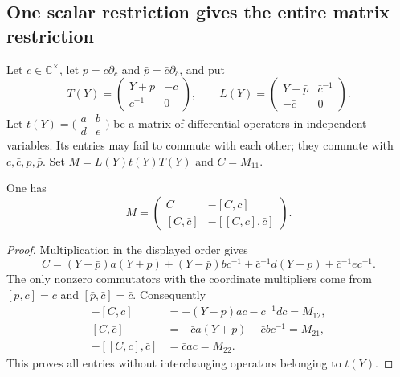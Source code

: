 \subsection{One scalar restriction gives the entire matrix restriction}

Let $c\in\mathbb C^\times$, let $p=c\partial_c$ and
$\bar p=\bar c\partial_{\bar c}$, and put
\[
 T(Y)=\begin{pmatrix}Y+p&-c\\c^{-1}&0\end{pmatrix},\qquad
 L(Y)=\begin{pmatrix}Y-\bar p&\bar c^{-1}\\-\bar c&0\end{pmatrix}.
\]
Let $t(Y)=\bigl(\begin{smallmatrix}a&b\\d&e\end{smallmatrix}\bigr)$
be a matrix of differential operators in independent variables.
Its entries may fail to commute with each other; they commute with
$c,\bar c,p,\bar p$.  Set $M=L(Y)t(Y)T(Y)$ and $C=M_{11}$.

\begin{lemma}\label{cm-scalar-sandwich}
One has
\begin{equation}\label{cm-sandwich-recovery}
 M=\begin{pmatrix}
 C&-[C,c]\\
 {[C,\bar c]}&-[[C,c],\bar c]
 \end{pmatrix}.
\end{equation}
\end{lemma}

\begin{proof}
Multiplication in the displayed order gives
\[
 C=(Y-\bar p)a(Y+p)+(Y-\bar p)b c^{-1}
                      +\bar c^{-1}d(Y+p)+\bar c^{-1}e c^{-1}.
\]
The only nonzero commutators with the coordinate multipliers
come from $[p,c]=c$ and $[\bar p,\bar c]=\bar c$.
Consequently
\begin{align*}
 -[C,c]&=-(Y-\bar p)ac-\bar c^{-1}dc=M_{12},\\
 [C,\bar c]&=-\bar c a(Y+p)-\bar c b c^{-1}=M_{21},\\
 -[[C,c],\bar c]&=\bar c a c=M_{22}.
\end{align*}
This proves all entries without interchanging operators belonging
to $t(Y)$.
\end{proof}

